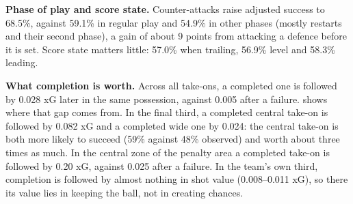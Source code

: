 \documentclass[
  12pt]{article}
\begin{document}
\textbf{Phase of play and score state.} Counter-attacks raise adjusted
success to 68.5\%, against 59.1\% in regular play and 54.9\% in other
phases (mostly restarts and their second phase), a gain of about 9
points from attacking a defence before it is set. Score state matters
little: 57.0\% when trailing, 56.9\% level and 58.3\% leading.

\textbf{What completion is worth.} Across all take-ons, a completed one
is followed by 0.028 xG later in the same possession, against 0.005
after a failure. shows where that gap comes from. In the final third, a
completed central take-on is followed by 0.082 xG and a completed wide
one by 0.024: the central take-on is both more likely to succeed (59\%
against 48\% observed) and worth about three times as much. In the
central zone of the penalty area a completed take-on is followed by 0.20
xG, against 0.025 after a failure. In the team's own third, completion
is followed by almost nothing in shot value (0.008--0.011 xG), so there
its value lies in keeping the ball, not in creating chances.
\end{document}
